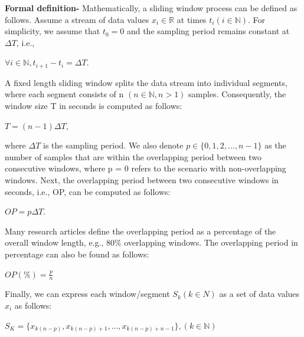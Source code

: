 \noindent\textbf{Formal definition-}
Mathematically, a sliding window process can be defined as follows.
Assume a stream of data values $x_i \in \mathbb{R} $ at times $t_i(i \in \mathbb{N})$. For simplicity, we assume that $t_0 = 0$ and the sampling period remains constant at $\Delta{T}$, i.e., 

$\forall i \in \mathbb{N}, t_{i + 1} - t_i = \Delta{T}$.

A fixed length sliding window splits the data stream into individual segments, where each segment
consists of n $(n \in \mathbb{N},n>1)$ samples. Consequently, the window size T in seconds is computed as follows:

$T = (n-1)\Delta{T}$,

where $\Delta{T}$ is the sampling period. We also denote $p \in {\{0,1,2,...,n-1\}}$ as the number of samples that are
within the overlapping period between two consecutive windows, where p = 0 refers to the
scenario with non-overlapping windows. Next, the overlapping period between two consecutive
windows in seconds, i.e., OP, can be computed as follows:

$OP = p\Delta{T}$.

Many research articles define the overlapping period as a percentage of the overall window length,
e.g., 80\% overlapping windows. The overlapping period in percentage can also be found as follows:

$ OP(\%) = \frac{p}{n} $

Finally, we can express each window/segment $S_k(k \in N)$ as a set of data values $x_i$ as follows:

$S_K = \{ x_{k(n-p)},x_{k(n-p)+1},..., x_{k(n-p)+n-1}\},(k \in \mathbb{N})$
\newline



